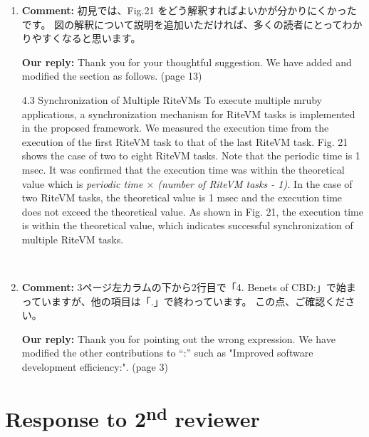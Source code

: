 \documentclass{article}
\newcommand\nd{\textsuperscript{nd}\xspace}
\begin{document}
\begin{enumerate}

\item \begin{flushleft}
    \textbf{Comment:
}初見では、Fig.21 をどう解釈すればよいかが分かりにくかったです。
図の解釈について説明を追加いただければ、多くの読者にとってわかりやすくなると思います。
  \end{flushleft}

  \begin{flushleft}
    \textbf{Our reply:}
Thank you for your thoughtful suggestion.
We have added and modified the section as follows. (page 13)

\begin{itembox}[|]{4.3 Synchronization of Multiple RiteVMs}
To execute multiple mruby applications, a synchronization mechanism for RiteVM tasks is implemented in the proposed framework.
We measured the execution time from the execution of the first RiteVM task to that of the last RiteVM task.
Fig. 21 shows the case of two to eight RiteVM tasks.
Note that the periodic time is 1 msec.
It was confirmed that the execution time was within the theoretical value which is {\it\scriptsize periodic time $\times$ (number of RiteVM tasks - 1).}
In the case of two RiteVM tasks, the theoretical value is 1 msec and the execution time does not exceed the theoretical value. 
As shown in Fig. 21, the execution time is within the theoretical value, which indicates successful synchronization of multiple RiteVM tasks.
\end{itembox}\\
  \end{flushleft}


\item \begin{flushleft}
    \textbf{Comment:}
3ページ左カラムの下から2行目で「4. Benets of CBD:」で始まっていますが、他の項目は「.」で終わっています。
この点、ご確認ください。
  \end{flushleft}

  \begin{flushleft}
    \textbf{Our reply:}
Thank you for pointing out the wrong expression.
We have modified the other contributions to ``:'' such as "Improved software development efficiency:". (page 3)
  \end{flushleft}

\end{enumerate}

\section{Response to 2\nd reviewer}
\end{document}
